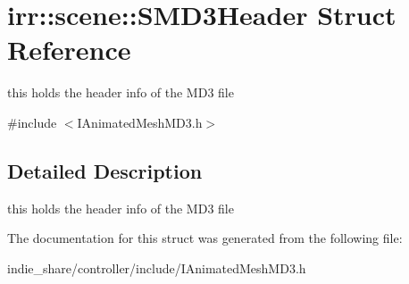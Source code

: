 \hypertarget{structirr_1_1scene_1_1SMD3Header}{}\section{irr\+:\+:scene\+:\+:S\+M\+D3\+Header Struct Reference}
\label{structirr_1_1scene_1_1SMD3Header}


this holds the header info of the M\+D3 file  




{\ttfamily \#include $<$I\+Animated\+Mesh\+M\+D3.\+h$>$}



\subsection{Detailed Description}
this holds the header info of the M\+D3 file 

The documentation for this struct was generated from the following file\+:\begin{DoxyCompactItemize}
\item 
indie\+\_\+share/controller/include/I\+Animated\+Mesh\+M\+D3.\+h\end{DoxyCompactItemize}
